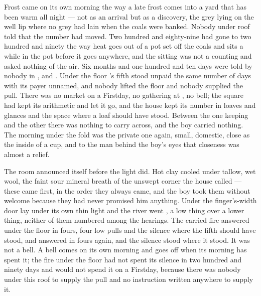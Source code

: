 
Frost came on its own morning the way a late frost comes into a yard that has been warm all night --- not as an arrival but as a discovery, the grey lying on the well lip where no grey had lain when the coals were banked. Nobody under  roof told  that the number had moved. Two hundred and eighty-nine had gone to two hundred and ninety the way heat goes out of a pot set off the coals and sits a while in the pot before it goes anywhere, and the sitting was not a counting and asked nothing of the air. Six months and one hundred and ten days were told by nobody in ,  and . Under the floor 's fifth stood unpaid the same number of days with its payer unnamed, and nobody lifted the floor and nobody supplied the pull. There was no market on a Firstday, no gathering at , no bell; the square had kept its arithmetic and let it go, and the house kept its number in loaves and glances and the space where a loaf should have stood. Between the one keeping and the other there was nothing to carry across, and the boy carried nothing. The morning under the fold was the private one again, small, domestic, close as the inside of a cup, and to the man behind the boy's eyes that closeness was almost a relief.

The room announced itself before the light did. Hot clay cooled under tallow, wet wool, the faint sour mineral breath of the unswept corner the house called  --- these came first, in the order they always came, and the boy took them without welcome because they had never promised him anything. Under the finger's-width door  lay under its own thin light and the river went , a low thing over a lower thing, neither of them numbered among the hearings. The carried fire answered under the floor in fours, four low pulls and the silence where the fifth should have stood, and answered in fours again, and the silence stood where it stood. It was not a bell. A bell comes on its own morning and goes off when its morning has spent it; the fire under the floor had not spent its silence in two hundred and ninety days and would not spend it on a Firstday, because there was nobody under this roof to supply the pull and no instruction written anywhere to supply it.

